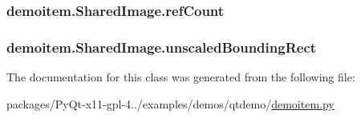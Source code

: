 \subsubsection[{ref\+Count}]{\setlength{\rightskip}{0pt plus 5cm}demoitem.\+Shared\+Image.\+ref\+Count}\label{classdemoitem_1_1SharedImage_a672a3edf4a975fe1fa8dd54910809818}
\hypertarget{classdemoitem_1_1SharedImage_a8607cf563727f1eed4ce1f601b07ab83}{}
\subsubsection[{unscaled\+Bounding\+Rect}]{\setlength{\rightskip}{0pt plus 5cm}demoitem.\+Shared\+Image.\+unscaled\+Bounding\+Rect}\label{classdemoitem_1_1SharedImage_a8607cf563727f1eed4ce1f601b07ab83}


The documentation for this class was generated from the following file\+:\begin{DoxyCompactItemize}
\item 
packages/\+Py\+Qt-\/x11-\/gpl-\/4../examples/demos/qtdemo/\hyperlink{demoitem_8py}{demoitem.\+py}\end{DoxyCompactItemize}
